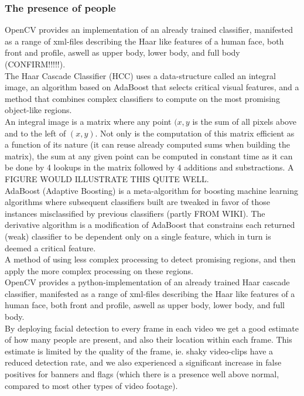 \subsubsection{The presence of people}
%
OpenCV provides an implementation of an already trained classifier, manifested as a range of xml-files describing the Haar like features of a human face, both front and profile, aswell as upper body, lower body, and full body (CONFIRM!!!!!).\\
%
%
The Haar Cascade Classifier (HCC) uses a data-structure called an integral image, an algorithm based on AdaBoost that selects critical visual features, and a method that combines complex classifiers to compute on the most promising object-like regions.\\
An integral image is a matrix where any point $(x,y$ is the sum of all pixels above and to the left of $(x,y)$. Not only is the computation of this matrix efficient as a function of its nature (it can reuse already computed sums when building the matrix), the sum at any given point can be computed in constant time as it can be done by 4 lookups in the matrix followed by 4 additions and substractions. A FIGURE WOULD ILLUSTRATE THIS QUITE WELL.\\
%
%
AdaBoost (Adaptive Boosting) is a meta-algorithm for boosting machine learning algorithms where subsequent classifiers built are tweaked in favor of those instances misclassified by previous classifiers (partly FROM WIKI). The derivative algorithm is a modification of AdaBoost that constrains each returned (weak) classifier to be dependent only on a single feature, which in turn is deemed a critical feature.\\
A method of using less complex processing to detect promising regions, and then apply the more complex processing on these regions.\\
OpenCV provides a python-implementation of an already trained Haar cascade classifier, manifested as a range of xml-files describing the Haar like features of a human face, both front and profile, aswell as upper body, lower body, and full body.\\
By deploying facial detection to every frame in each video we get a good estimate of how many people are present, and also their location within each frame. This estimate is limited by the quality of the frame, ie. shaky video-clips have a reduced detection rate, and we also experienced a significant increase in false positives for banners and flags (which there is a presence well above normal, compared to most other types of video footage).\\
